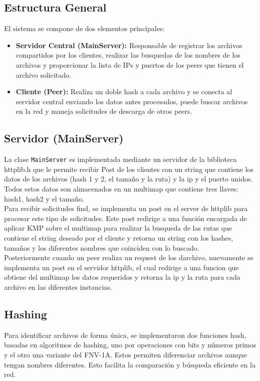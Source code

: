 \documentclass{article}
\begin{document}
\subsection{Estructura General}
El sistema se compone de dos elementos principales:
\begin{itemize}
    \item \textbf{Servidor Central (MainServer):} Responsable de registrar los archivos compartidos por los clientes, realizar las busquedas de los nombres de los archivos y proporcionar la lista de IPs y puertos de los peers que tienen el archivo solicitado.
    \item \textbf{Cliente (Peer):} Realiza un doble hash a cada archivo y se conecta al servidor central enviando los datos antes procesados, puede buscar archivos en la red y maneja solicitudes de descarga de otros peers.
\end{itemize}

\subsection{Servidor (MainServer)}
La clase \texttt{MainServer} es implementada mediante un servidor de la biblioteca httplib.h que le permite recibir Post de los clientes con un string que contiene los datos de los archivos (hash 1 y 2, el tamaño y la ruta) y la ip y el puerto unidos. Todos estos datos son almacenados en un multimap que contiene tres llaves: hash1, hash2 y el tamaño.\\
Para recibir solicitudes find, se implementa un post en el server de httplib para procesar este tipo de solicitudes. Este post redirige a una funci\'on encargada de aplicar KMP sobre el multimap para realizar la busqueda de las rutas que contiene el string deseado por el cliente y retorna un string con los hashes, tamaños y los diferentes nombres que coinciden con lo buscado.\\
Posteriormente cuando  un peer realiza un request de los darchivo, nuevamente se implementa un post en el servidor httplib, el cual redirige a una funcion que obtiene del multimap los datos requeridos y retorna la ip y la ruta para cada archivo en las diferentes instancias.\\

\subsection{Hashing}
Para identificar archivos de forma única, se implementaron dos funciones hash, basadas en algoritmos de hashing, uno por operaciones con bits y n\'umeros primos y el otro una variante del FNV-1A. Estos permiten diferenciar archivos aunque tengan nombres diferentes. Esto facilita la comparación y búsqueda eficiente en la red.
\end{document}
